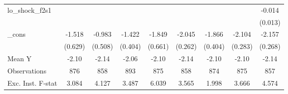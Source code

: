 {\begin{tabular}{l*{8}{c}}
\addlinespace
lo\_shock\_f2s1&                     &                     &                     &                     &                     &                     &                     &      -0.014         \\
            &                     &                     &                     &                     &                     &                     &                     &     (0.013)         \\
\addlinespace
\_cons      &      -1.518\sym{**} &      -0.983\sym{*}  &      -1.422\sym{***}&      -1.849\sym{***}&      -2.045\sym{***}&      -1.866\sym{***}&      -2.104\sym{***}&      -2.157\sym{***}\\
            &     (0.629)         &     (0.508)         &     (0.404)         &     (0.661)         &     (0.262)         &     (0.404)         &     (0.283)         &     (0.268)         \\
\midrule
Mean Y      &       -2.10         &       -2.14         &       -2.06         &       -2.10         &       -2.14         &       -2.10         &       -2.10         &       -2.14         \\
Observations&         876         &         858         &         893         &         875         &         858         &         874         &         875         &         857         \\
Exc. Inst. F-stat&       3.084         &       4.127         &       3.487         &       6.039         &       3.565         &       1.998         &       3.666         &       4.574         \\
\bottomrule
\end{tabular}
}
